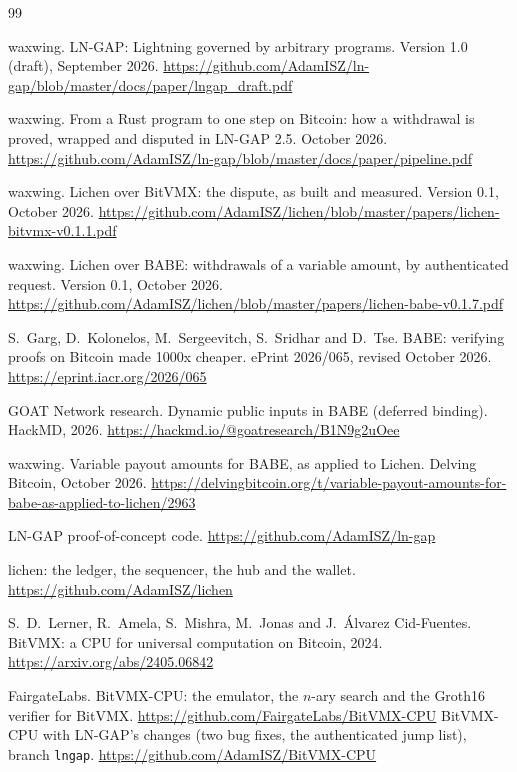 \documentclass[11pt]{article}
\begin{document}
\begin{thebibliography}{99}

 waxwing. LN-GAP: Lightning governed by arbitrary programs. Version 1.0 (draft), September 2026. \url{https://github.com/AdamISZ/ln-gap/blob/master/docs/paper/lngap_draft.pdf}

 waxwing. From a Rust program to one step on Bitcoin: how a withdrawal is proved, wrapped and disputed in LN-GAP 2.5. October 2026. \url{https://github.com/AdamISZ/ln-gap/blob/master/docs/paper/pipeline.pdf}

 waxwing. Lichen over BitVMX: the dispute, as built and measured. Version 0.1, October 2026. \url{https://github.com/AdamISZ/lichen/blob/master/papers/lichen-bitvmx-v0.1.1.pdf}

 waxwing. Lichen over BABE: withdrawals of a variable amount, by authenticated request. Version 0.1, October 2026. \url{https://github.com/AdamISZ/lichen/blob/master/papers/lichen-babe-v0.1.7.pdf}

 S.~Garg, D.~Kolonelos, M.~Sergeevitch, S.~Sridhar and D.~Tse. BABE: verifying proofs on Bitcoin made 1000x cheaper. ePrint 2026/065, revised October 2026. \url{https://eprint.iacr.org/2026/065}

 GOAT Network research. Dynamic public inputs in BABE (deferred binding). HackMD, 2026. \url{https://hackmd.io/@goatresearch/B1N9g2uOee}

 waxwing. Variable payout amounts for BABE, as applied to Lichen. Delving Bitcoin, October 2026. \url{https://delvingbitcoin.org/t/variable-payout-amounts-for-babe-as-applied-to-lichen/2963}

 LN-GAP proof-of-concept code. \url{https://github.com/AdamISZ/ln-gap}

 lichen: the ledger, the sequencer, the hub and the wallet. \url{https://github.com/AdamISZ/lichen}

 S.~D.~Lerner, R.~Amela, S.~Mishra, M.~Jonas and J.~\'Alvarez Cid-Fuentes. BitVMX: a CPU for universal computation on Bitcoin, 2024. \url{https://arxiv.org/abs/2405.06842}

 FairgateLabs. BitVMX-CPU: the emulator, the $n$-ary search and the Groth16 verifier for BitVMX. \url{https://github.com/FairgateLabs/BitVMX-CPU}
 BitVMX-CPU with LN-GAP's changes (two bug fixes, the authenticated jump list), branch \texttt{lngap}. \url{https://github.com/AdamISZ/BitVMX-CPU}


\end{thebibliography}
\end{document}
